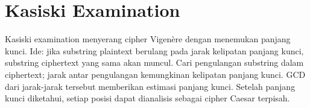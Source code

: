 \section{Kasiski Examination}

Kasiski examination menyerang cipher Vigenère dengan menemukan panjang kunci. Ide: jika substring plaintext berulang pada jarak kelipatan panjang kunci, substring ciphertext yang sama akan muncul. Cari pengulangan substring dalam ciphertext; jarak antar pengulangan kemungkinan kelipatan panjang kunci. GCD dari jarak-jarak tersebut memberikan estimasi panjang kunci. Setelah panjang kunci diketahui, setiap posisi dapat dianalisis sebagai cipher Caesar terpisah.
